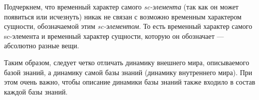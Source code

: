 Подчеркнем, что временный характер самого \textit{sc-элемента} (так как он может появиться или исчезнуть) никак не связан с возможно временным характером сущности, обозначаемой этим \textit{sc-элементом}. То есть временный характер самого sc-элемента и временный характер сущности, которую он обозначает --- абсолютно разные вещи.

Таким образом, следует четко отличать динамику внешнего мира, описываемого базой знаний, а динамику самой базы знаний (динамику внутреннего мира). При этом очень важно, чтобы описание динамики базы знаний также входило в состав каждой базы знаний.

\begin{comment}
		

К числу понятий, используемых для описания динамики базы знаний относятся:
\begin{textitemize}
	\item логически удаленный sc-элемент;
	\item сформированное множество;
	\item вычисленное число;
	\item сформированное высказывание;
\end{textitemize}

\begin{SCn}
\scnheader{sc-элемент}
\begin{scnrelfromset}{разбиение}
	\scnitem{наcтоящий sc-элемент}
	\scnitem{логически удаленный sc-элемент}
\end{scnrelfromset}

\scnheader{наcтоящий sc-элемент}
\scniselement{ситуативное множество}

\scnheader{логически удаленный sc-элемент}
\scniselement{ситуативное множество}


\scnheader{основное понятие}
\scnidtf{основное понятие для данной ostis-системы}
\scniselement{ситуативное множество}
\end{SCn}

К \textbf{\textit{основным понятиям}} относятся те понятия, которые активно используются в системе и могут быть ключевыми элементами sc-агентов. К \textit{основным понятиям} относятся также все неопределяемые понятия.

\begin{SCn}
\scnheader{неосновное понятие}
\scnidtf{дополнительное понятие}
\scnidtf{вспомогательное понятие}
\scnidtf{неосновное понятие для данной ostis-системы}
\scniselement{ситуативное множество}
\end{SCn}


\end{comment}
